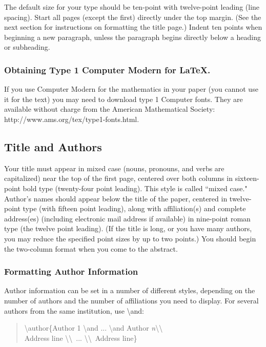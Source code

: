 \documentclass[letterpaper]{article}
\begin{document}
The default size for your type should be ten-point with twelve-point leading (line spacing). Start all pages (except the first) directly under the top margin. (See the next section for instructions on formatting the title page.) Indent ten points when beginning a new paragraph, unless the paragraph begins directly below a heading or subheading.

\subsubsection{Obtaining Type 1 Computer Modern for \LaTeX{}.}

If you use Computer Modern for the mathematics in your paper (you cannot use it for the text) you may need to download type 1 Computer fonts. They are available without charge from the American Mathematical Society:
http://www.ams.org/tex/type1-fonts.html. 

\subsection{Title and Authors}
Your title must appear in mixed case (nouns, pronouns, and verbs are capitalized) near the top of the first page, centered over both columns in sixteen-point bold type (twenty-four point leading). This style is called ``mixed case." Author's names should appear below the title of the paper, centered in twelve-point type (with fifteen point leading), along with affiliation(s) and complete address(es) (including electronic mail address if available) in nine-point roman type (the twelve point leading). (If the title is long, or you have many authors, you may reduce the specified point sizes by up to two points.) You should begin the two-column format when you come to the abstract. 

\subsubsection{Formatting Author Information}
Author information can be set in a number of different styles, depending on the number of authors and the number of affiliations you need to display. For several authors from the same institution, use \textbackslash and:

\begin{quote}
\begin{small}
\textbackslash author\{Author 1 \textbackslash and  ...  \textbackslash and Author \textit{n}\textbackslash \textbackslash  \\
Address line \textbackslash \textbackslash ~... \textbackslash \textbackslash ~Address line\}
\end{small}
\end{quote}
\end{document}
